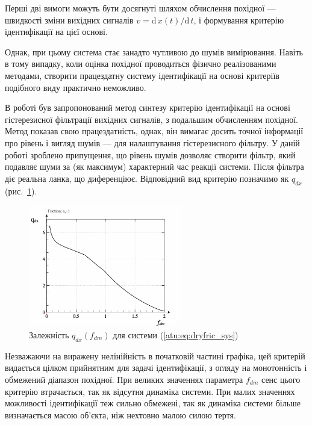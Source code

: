 Перші дві вимоги можуть бути досягнуті шляхом обчислення
похідної ---
швидкості зміни вихідних сигналів
\(v = \mathrm{d} \, x (t) / \mathrm{d} \, t \),
і формування критерію ідентифікації на цієї основі.

Однак, при цьому система стає занадто чутливою до шумів
вимірювання. Навіть в тому випадку, коли оцінка похідної
проводиться фізично реалізованими методами, створити
працездатну систему ідентифікації на основі критеріїв
подібного виду практично неможливо.

В роботі \cite{atu_asau11} був запропонований метод синтезу критерію
ідентифікації на основі гістерезисної фільтрації вихідних
сигналів, з подальшим обчисленням похідної. Метод показав свою
працездатність, однак, він вимагає досить точної інформації про
рівень і вигляд шумів --- для налаштування гістерезисного фільтру.
У даній роботі зроблено припущення, що рівень шумів дозволяє створити фільтр, який
подавляє шуми за (як максимум) характерний час реакції системи. Після
фільтра діє реальна ланка, що диференціює. Відповідний вид критерію позначимо як
$q_{dx}$ (рис.~\ref{atu:f:fric_q}).

\begin{figure}[htb!]
\centerline{
  \includegraphics[width=0.60\textwidth]{p/cha/fric/fric_q-p_f_dm_q.png}
}
\caption{Залежність $q_{dx}(f_{dm})$ для системи (\ref{atu:eq:dryfric_sys}) }
\label{atu:f:fric_q}
\end{figure}

Незважаючи на виражену нелінійність в початковій частині
графіка, цей критерій видається цілком прийнятним для задачі
ідентифікації, з огляду на монотонність і обмежений діапазон
похідної. При великих значеннях параметра
$f_{dm}$ сенс цього критерію втрачається, так як відсутня динаміка
системи. При малих значеннях можливості ідентифікації теж
сильно обмежені, так як динаміка системи більше визначається
масою об'єкта, ніж нехтовно малою силою тертя.

